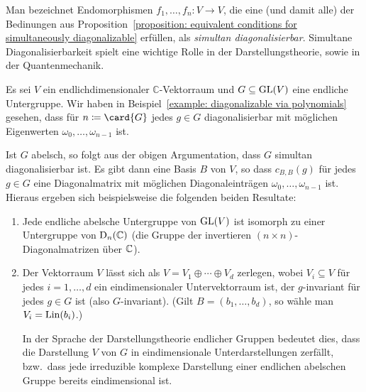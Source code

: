 Man bezeichnet Endomorphismen $f_1, \dotsc, f_n \colon V \to V$, die eine (und damit alle) der Bedinungen aus Proposition~\ref{proposition: equivalent conditions for simultaneously diagonalizable} erfüllen, als \emph{simultan diagonalisierbar}.
Simultane Diagonalisierbarkeit spielt eine wichtige Rolle in der Darstellungstheorie, sowie in der Quantenmechanik.

\begin{example}
  Es sei $V$ ein endlichdimensionaler $\mathbb{C}$-Vektorraum und $G \subseteq \operatorname{GL}(V)$ eine endliche Untergruppe.
  Wir haben in Beispiel~\ref{example: diagonalizable via polynomials} gesehen, dass für $n \defined \card{G}$ jedes $g \in G$ diagonalisierbar mit möglichen Eigenwerten $\omega_0, \dotsc, \omega_{n-1}$ ist.
  
  Ist $G$ abelsch, so folgt aus der obigen Argumentation, dass $G$ simultan diagonalisierbar ist.
  Es gibt dann eine Basis $B$ von $V$, so dass $c_{B,B}(g)$ für jedes $g \in G$ eine Diagonalmatrix mit möglichen Diagonaleinträgen $\omega_0, \dotsc, \omega_{n-1}$ ist.
  Hieraus ergeben sich beispielsweise die folgenden beiden Resultate:
  \begin{enumerate}
    \item
      Jede endliche abelsche Untergruppe von $\operatorname{GL}(V)$ ist isomorph zu einer Untergruppe von $\operatorname{D}_{n}(\mathbb{C})$ (die Gruppe der invertieren $(n \times n)$-Diagonalmatrizen über $\mathbb{C}$).
    \item
      Der Vektorraum $V$ lässt sich als $V = V_1 \oplus \dotsb \oplus V_d$ zerlegen, wobei $V_i \subseteq V$ für jedes $i = 1, \dotsc, d$ ein eindimensionaler Untervektorraum ist, der $g$-invariant für jedes $g \in G$ ist (also $G$-invariant).
      (Gilt $B = (b_1, \dotsc, b_d)$, so wähle man $V_i = \operatorname{Lin}(b_i)$.)
      
      In der Sprache der Darstellungstheorie endlicher Gruppen bedeutet dies, dass die Darstellung $V$ von $G$ in eindimensionale Unterdarstellungen zerfällt, bzw.\ dass jede irreduzible komplexe Darstellung einer endlichen abelschen Gruppe bereits eindimensional ist.
  \end{enumerate}
\end{example}
